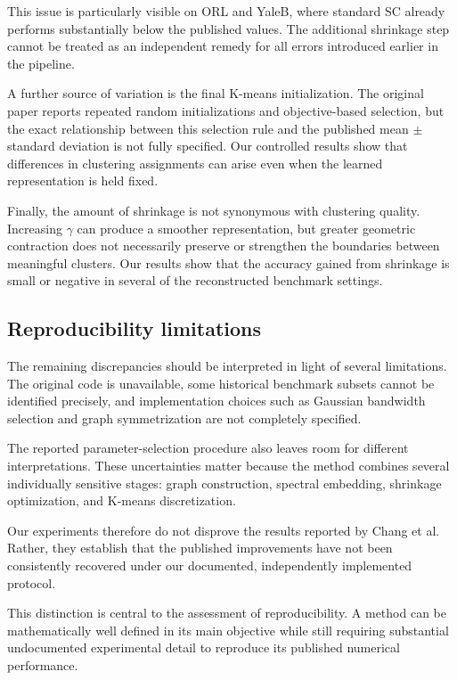 \documentclass{article}
\begin{document}
This issue is particularly visible on ORL and YaleB, where standard SC already performs substantially below the published values. The additional shrinkage step cannot be treated as an independent remedy for all errors introduced earlier in the pipeline.

A further source of variation is the final K-means initialization. The original paper reports repeated random initializations and objective-based selection, but the exact relationship between this selection rule and the published mean $\pm$ standard deviation is not fully specified. Our controlled results show that differences in clustering assignments can arise even when the learned representation is held fixed.

Finally, the amount of shrinkage is not synonymous with clustering quality. Increasing \(\gamma\) can produce a smoother representation, but greater geometric contraction does not necessarily preserve or strengthen the boundaries between meaningful clusters. Our results show that the accuracy gained from shrinkage is small or negative in several of the reconstructed benchmark settings.

\subsection{Reproducibility limitations}

The remaining discrepancies should be interpreted in light of several limitations. The original code is unavailable, some historical benchmark subsets cannot be identified precisely, and implementation choices such as Gaussian bandwidth selection and graph symmetrization are not completely specified.

The reported parameter-selection procedure also leaves room for different interpretations. These uncertainties matter because the method combines several individually sensitive stages: graph construction, spectral embedding, shrinkage optimization, and K-means discretization.

Our experiments therefore do not disprove the results reported by Chang et al. Rather, they establish that the published improvements have not been consistently recovered under our documented, independently implemented protocol.

This distinction is central to the assessment of reproducibility. A method can be mathematically well defined in its main objective while still requiring substantial undocumented experimental detail to reproduce its published numerical performance.
\end{document}
